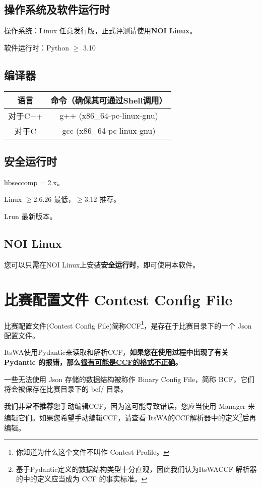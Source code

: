\documentclass[UTF8]{ctexart}
\newcommand{\itswa}{ItsWA}
\begin{document}
        \subsection{操作系统及软件运行时}
            操作系统：Linux 任意发行版，正式评测请使用\textbf{NOI Linux}。

            软件运行时：Python $\geq$ 3.10

        \subsection{编译器}
            \begin{tabular}{|c|c|}
                \hline
                \textbf{语言} & \textbf{命令（确保其可通过Shell调用）} \\
                \hline
                对于C++ & g++ (x86\_64-pc-linux-gnu) \\
                \hline
                对于C & gcc \space \space (x86\_64-pc-linux-gnu) \\
                \hline
            \end{tabular}

        \subsection{安全运行时}
            libseccomp = 2.x。

            Linux $\ge 2.6.26$ 最低，$\ge 3.12$ 推荐。

            Lrun 最新版本。
        
        \subsection{NOI Linux}
            您可以只需在NOI Linux上安装\textbf{安全运行时}，即可使用本软件。
    
    \section{比赛配置文件 Contest Config File}
        比赛配置文件(Contest Config File)简称CCF\footnote{你知道为什么这个文件不叫作 Contest Profile。}，是存在于比赛目录下的一个 Json 配置文件。

        \itswa 使用Pydantic来读取和解析CCF，\textbf{如果您在使用过程中出现了有关 Pydantic 的报错，那么\uline{很有可能是CCF的格式不正确}。}
        
        一些无法使用 Json 存储的数据结构被称作 Binary Config File，简称 BCF，它们将会被保存在比赛目录下的 bcf/ 目录。

        我们非常\textbf{不推荐}您手动编辑CCF，因为这可能导致错误，您应当使用 Manager 来编辑它们。如果您希望手动编辑CCF，请查看 \itswa 的CCF解析器中的定义\footnote{基于Pydantic定义的数据结构类型十分直观，因此我们认为\itswa CCF 解析器的中的定义应当成为 CCF 的事实标准。}后再编辑。
\end{document}
